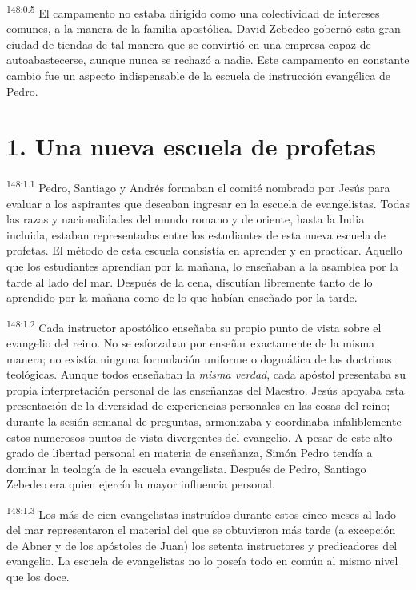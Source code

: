\par
\textsuperscript{148:0.5} El campamento no estaba dirigido como una colectividad de intereses comunes, a la manera de la familia apostólica. David Zebedeo gobernó esta gran ciudad de tiendas de tal manera que se convirtió en una empresa capaz de autoabastecerse, aunque nunca se rechazó a nadie. Este campamento en constante cambio fue un aspecto indispensable de la escuela de instrucción evangélica de Pedro.

\section*{1. Una nueva escuela de profetas}
\par
\textsuperscript{148:1.1} Pedro, Santiago y Andrés formaban el comité nombrado por Jesús para evaluar a los aspirantes que deseaban ingresar en la escuela de evangelistas. Todas las razas y nacionalidades del mundo romano y de oriente, hasta la India incluida, estaban representadas entre los estudiantes de esta nueva escuela de profetas. El método de esta escuela consistía en aprender y en practicar. Aquello que los estudiantes aprendían por la mañana, lo enseñaban a la asamblea por la tarde al lado del mar. Después de la cena, discutían libremente tanto de lo aprendido por la mañana como de lo que habían enseñado por la tarde.

\par
\textsuperscript{148:1.2} Cada instructor apostólico enseñaba su propio punto de vista sobre el evangelio del reino. No se esforzaban por enseñar exactamente de la misma manera; no existía ninguna formulación uniforme o dogmática de las doctrinas teológicas. Aunque todos enseñaban la \textit{misma verdad}, cada apóstol presentaba su propia interpretación personal de las enseñanzas del Maestro. Jesús apoyaba esta presentación de la diversidad de experiencias personales en las cosas del reino; durante la sesión semanal de preguntas, armonizaba y coordinaba infaliblemente estos numerosos puntos de vista divergentes del evangelio. A pesar de este alto grado de libertad personal en materia de enseñanza, Simón Pedro tendía a dominar la teología de la escuela evangelista. Después de Pedro, Santiago Zebedeo era quien ejercía la mayor influencia personal.

\par
\textsuperscript{148:1.3} Los más de cien evangelistas instruídos durante estos cinco meses al lado del mar representaron el material del que se obtuvieron más tarde (a excepción de Abner y de los apóstoles de Juan) los setenta instructores y predicadores del evangelio. La escuela de evangelistas no lo poseía todo en común al mismo nivel que los doce.


